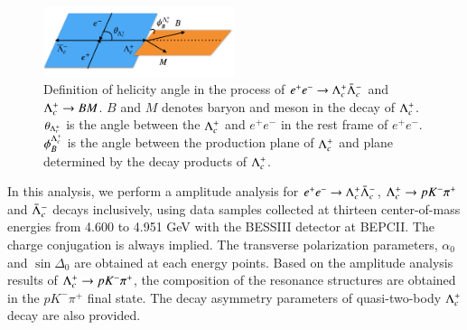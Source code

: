\begin{figure}[htbp]
    \centering
    \includegraphics[width=0.50\textwidth]{figure/helicity.png}
    \caption{Definition of helicity angle in the process of $e^+e^- \rightarrow \Lambda_{c}^{+}\bar{\Lambda}_{c}^{-}$ and $\Lambda_{c}^{+} \rightarrow BM$. $B$ and $M$ denotes baryon and meson in the decay of $\Lambda_{c}^{+}$. $\theta_{\Lambda_{c}^{+}}$ is the angle between the $\Lambda_{c}^{+}$ and $e^+e^-$ in the rest frame of $e^+e^-$. $\phi_{B}^{\Lambda_{c}^{+}}$ is the angle between the production plane of $\Lambda_{c}^{+}$ and plane determined by the decay products of $\Lambda_{c}^{+}$.} 
    \label{fig:helicity_ee_lclp}
\end{figure}

In this analysis, we perform a amplitude analysis for $e^+e^- \rightarrow \Lambda_{c}^{+}\bar{\Lambda}_{c}^{-}$, $\Lambda_{c}^{+} \rightarrow p K^- \pi^+$ and $\bar{\Lambda}_{c}^{-}$ decays inclusively, using data samples collected at thirteen center-of-mass energies from 4.600 to 4.951 GeV with the BESSIII detector at BEPCII. The charge conjugation is always implied. The transverse polarization parameters, $\alpha_0$ and $\sin\Delta_0$ are obtained at each energy points. Based on the amplitude analysis results of $\Lambda_{c}^{+} \rightarrow pK^-\pi^+$, the composition of the resonance structures are obtained in the $pK^-\pi^+$ final state. The decay asymmetry parameters of quasi-two-body $\Lambda_{c}^{+}$ decay are also provided.
